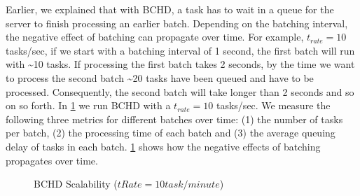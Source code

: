 Earlier, we explained that with BCHD, a task has to wait in a queue for the server to finish processing an earlier batch. Depending on the batching interval, the negative effect of batching can propagate over time. For example, $t_{rate} = 10$ tasks/sec, if we start with a batching interval of 1 second, the first batch will run with \textasciitilde 10 tasks. If processing the first batch takes 2 seconds, by the time we want to process the second batch \textasciitilde 20 tasks have been queued and have to be processed. Consequently, the second batch will take longer than 2 seconds and so on so forth. In \cref{fig:bs} we run BCHD with a $t_{rate} = 10$ tasks/sec. We measure the following three metrics for different batches over time: (1) the number of tasks per batch, (2) the processing time of each batch and (3) the average queuing delay of tasks in each batch. \cref{fig:bs} shows how the negative effects of batching propagates over time.\\

\begin{figure}[h]
    \centering
    \vspace{-0.15in}
    \caption{BCHD Scalability ($tRate = 10 task/minute$)}
    \label{fig:bs}
\end{figure}

